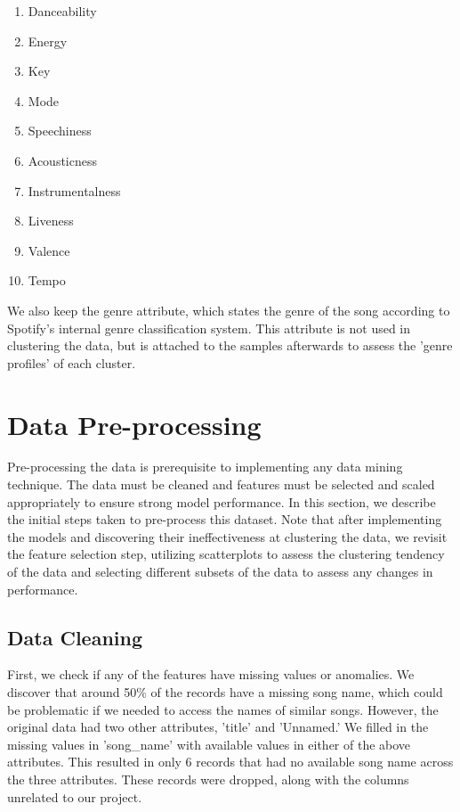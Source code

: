 \documentclass[conference]{IEEEtran}
\begin{document}
    \begin{enumerate}
        \item Danceability
        \item Energy
        \item Key
        \item Mode
        \item Speechiness
        \item Acousticness
        \item Instrumentalness
        \item Liveness
        \item Valence
        \item Tempo
    \end{enumerate}

We also keep the genre attribute, which states the genre of the song according to Spotify's internal genre classification system. This attribute is not used in clustering the data, but is attached to the samples afterwards to assess the 'genre profiles' of each cluster.

\section{Data Pre-processing}
Pre-processing the data is prerequisite to implementing any data mining technique. The data must be cleaned and features must be selected and scaled appropriately to ensure strong model performance. In this section, we describe the initial steps taken to pre-process this dataset. Note that after implementing the models and discovering their ineffectiveness at clustering the data, we revisit the feature selection step, utilizing scatterplots to assess the clustering tendency of the data and selecting different subsets of the data to assess any changes in performance. 

\subsection{Data Cleaning} 
First, we check if any of the features have missing values or anomalies. We discover that around 50\% of the records have a missing song name, which could be problematic if we needed to access the names of similar songs. However, the original data had two other attributes, 'title' and 'Unnamed.' We filled in the missing values in 'song\_name' with available values in either of the above attributes. This resulted in only 6 records that had no available song name across the three attributes. These records were dropped, along with the columns unrelated to our project. 
\end{document}
